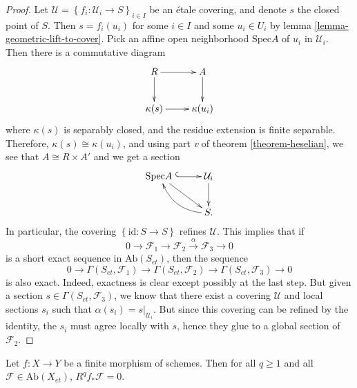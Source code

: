 \begin{proof}
Let $\mathcal{U} = \left\{f_i : \mathcal{U}_i \to S \right\}_{i\in I}$ be an 
\'etale covering, and denote $s$ the closed point of $S$. Then $s = f_i (u_i)$ 
for some $i\in I$ and some $u_i \in U_i$ by lemma 
\ref{lemma-geometric-lift-to-cover}. Pick an affine open neighborhood 
$\text{Spec} A$ of $u_i$ in $\mathcal{U}_i$. Then there is a commutative diagram
$$
\xymatrix{
R \ar[r] \ar[d] & A \ar[d] \\
{\kappa(s)} \ar[r] & {\kappa(u_i)}
}
$$
where $\kappa(s)$ is separably closed, and the residue extension is finite 
separable. Therefore, $\kappa(s) \cong \kappa(u_i)$, and using part {\it v} of 
theorem \ref{theorem-heselian}, we see that $A \cong R\times A'$ and we get a 
section
$$
\xymatrix{
{\text{Spec} A\ }\ar[dr] \ar@{^{(}->}[r] & {\mathcal{U}_i} \ar[d]\\
& {S.} \ar@/^1pc/[ul]
}
$$
In particular, the covering $\left\{\text{id} : S\to S\right\}$ refines 
$\mathcal{U}$. This implies that if 
$$
0 \to \mathcal{F}_1\to \mathcal{F}_2 \xrightarrow{\alpha} \mathcal{F}_3\to 0
$$
is a short exact sequence in $\text{Ab}(S_{et})$, then the sequence
$$
0 \to \Gamma(S_{et}, \mathcal{F}_1) \to \Gamma(S_{et}, \mathcal{F}_2) \to 
\Gamma(S_{et}, \mathcal{F}_3)\to 0
$$
is also exact. Indeed, exactness is clear except possibly at the last step. But 
given a section $s \in \Gamma(S_{et}, \mathcal{F}_3)$, we know that there exist 
a covering $\mathcal{U}$ and local sections $s_i$ such that $\alpha (s_i) = 
s|_{\mathcal{U}_i}$. But since this covering can be refined by the identity, 
the $s_i$ must agree locally with $s$, hence they glue to a global section of 
$\mathcal{F}_2$.
\end{proof}

\begin{proposition}
\label{proposition-finite-higher-direct-image-zero}
Let $f: X\to Y$ be a finite morphism of schemes. Then for all $q\geq 1$ and all 
$\mathcal{F}\in \text{Ab}(X_{et})$, $R^q f_*\mathcal{F}=0$. 
\end{proposition}

